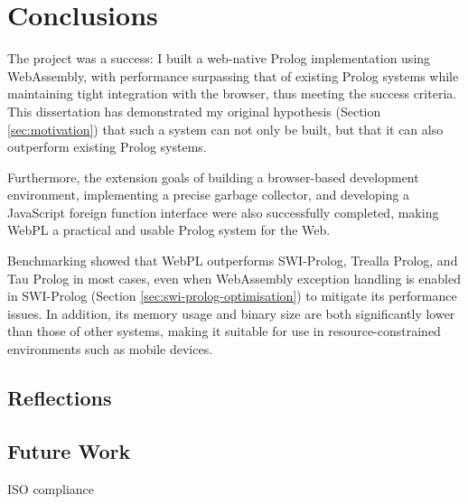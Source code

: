 \chapter{Conclusions}

The project was a success: I built a web-native Prolog implementation using WebAssembly, with performance surpassing that of existing Prolog systems while maintaining tight integration with the browser, thus meeting the success criteria. This dissertation has demonstrated my original hypothesis (Section \ref{sec:motivation}) that such a system can not only be built, but that it can also outperform existing Prolog systems.

Furthermore, the extension goals of building a browser-based development environment, implementing a precise garbage collector, and developing a JavaScript foreign function interface were also successfully completed, making WebPL a practical and usable Prolog system for the Web.

Benchmarking showed that WebPL outperforms SWI-Prolog, Trealla Prolog, and Tau Prolog in most cases, even when WebAssembly exception handling is enabled in SWI-Prolog (Section \ref{sec:swi-prolog-optimisation}) to mitigate its performance issues. In addition, its memory usage and binary size are both significantly lower than those of other systems, making it suitable for use in resource-constrained environments such as mobile devices.

\section{Reflections}



\section{Future Work}

ISO compliance